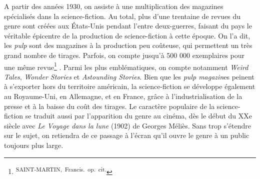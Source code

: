 \documentclass[letterpaper,portrait,12pt]{article}
\begin{document}
	A partir des ann\'{e}es 1930, on assiste \`{a} une multiplication des magazines sp\'{e}cialis\'{e}s dans la science-fiction. Au total, plus d'une trentaine de revues du genre\emph{ }sont cr\'{e}\'{e}es aux \'{E}tats-Unis pendant l'entre deux-guerres, faisant du pays le v\'{e}ritable \'{e}picentre de la production de science-fiction \`{a} cette \'{e}poque.\textbf{ }On l'a dit, les\emph{ pulp} sont des magazines \`{a} la production peu co\^{u}teuse, qui permettent un  tr\`{e}s grand nombre de tirages. Parfois, on compte jusqu'\`{a} 500 000 exemplaires pour une m\^{e}me revue\footnote{\textsuperscript{\newpage
}\textsuperscript{	SAINT-MARTIN,\ Francis.\ op.\ cit.}} . Parmi les plus embl\'{e}matiques, on compte notamment\emph{ Weird Tales},\emph{ Wonder Stories} et\emph{ Astounding Stories}. Bien que les\emph{ pulp magazin}es\emph{ }peinent \`{a} s'exporter hors du territoire am\'{e}ricain, la science-fiction se d\'{e}veloppe \'{e}galement au Royaume-Uni, en Allemagne, et en France, gr\^{a}ce \`{a} l'industrialisation de la presse et \`{a} la baisse du co\^{u}t des tirages. Le caract\`{e}re populaire de la science-fiction se traduit aussi par l'apparition du genre au cin\'{e}ma, d\`{e}s le d\'{e}but du XXe si\`{e}cle avec \emph{Le Voyage dans la lune} (1902) de Georges M\'{e}li\`{e}s. Sans trop s'\'{e}tendre sur le sujet, on retiendra de ce passage \`{a} l'\'{e}cran qu'il ouvre le genre \`{a} un public toujours plus large.
\end{document}
